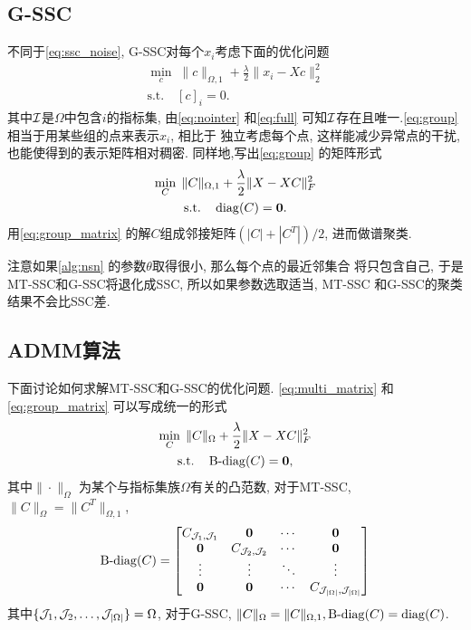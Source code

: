 \subsection{G-SSC}
不同于\eqref{eq:ssc_noise},  G-SSC对每个\(x_i\)考虑下面的优化问题
\begin{equation}
  \begin{gathered}
    \min_{c} \; \|c\|_{\Omega, 1} + \frac{\lambda}{2} \|x_i - Xc\|_2^2\\
    \text{s.t.} \quad [c]_i = 0.
  \end{gathered}
  \label{eq:group}
\end{equation}
其中\(\mathcal{I}\)是\(\Omega\)中包含\(i\)的指标集, 由\eqref{eq:nointer} 和\eqref{eq:full} 
可知\(\mathcal{I}\)存在且唯一.\eqref{eq:group} 相当于用某些组的点来表示\(x_i\), 相比于
独立考虑每个点, 这样能减少异常点的干扰, 也能使得到的表示矩阵相对稠密.
同样地,写出\eqref{eq:group} 的矩阵形式
\begin{equation}
  \begin{gathered}
    \min_C\; \|C\|_{\Omega, 1} + \frac{\lambda}{2} \|X-XC\|_F^2 \\
    \text{s.t.} \quad \operatorname{diag}(C) = \mathbf{0}.
  \end{gathered}
  \label{eq:group_matrix}
\end{equation}
用\eqref{eq:group_matrix} 的解\(C\)组成邻接矩阵\((|C|+|C^T|)/2\), 进而做谱聚类.

注意如果\autoref{alg:nsn} 的参数\(\theta\)取得很小, 那么每个点的最近邻集合
将只包含自己, 于是MT-SSC和G-SSC将退化成SSC, 所以如果参数选取适当, MT-SSC
和G-SSC的聚类结果不会比SSC差.

\subsection{ADMM算法}
下面讨论如何求解MT-SSC和G-SSC的优化问题.
\eqref{eq:multi_matrix} 和\eqref{eq:group_matrix} 可以写成统一的形式
\begin{equation}\label{eq:MatrixLasso}
  \begin{gathered}
    \min_{C} \; \|C\|_{\Omega}+\frac{\lambda}{2}\|X-XC\|_F^2  \\
    \text{s.t.} \quad \operatorname{B-diag}(C)=\mathbf{0},
  \end{gathered}
\end{equation}
其中\(\|\cdot\|_{\Omega}\) 为某个与指标集族\(\Omega\)有关的凸范数,
对于MT-SSC, \(\|C\|_{\Omega}=\|C^T\|_{\Omega, 1}\), 
\[
  \operatorname{B-diag}(C)=\begin{bmatrix}
    C_{\mathcal{J}_1, \mathcal{J}_1}  & \mathbf{0} & \cdots & \mathbf{0} \\
    \mathbf{0}  & C_{\mathcal{J}_2, \mathcal{J}_2} & \cdots & \mathbf{0} \\
    \vdots   &    \vdots    &    \ddots     & \vdots \\
    \mathbf{0}  &  \mathbf{0} &  \cdots  & C_{\mathcal{J}_{|\Omega|},\mathcal{J}_{|\Omega|}}
  \end{bmatrix}
\]
其中\(\{\mathcal{J}_1, \mathcal{J}_2,\ldots,\mathcal{J}_{|\Omega|}\}=\Omega\),
对于G-SSC, \(\|C\|_{\Omega}=\|C\|_{\Omega, 1}, \operatorname{B-diag}(C) = \operatorname{diag}(C)\).

